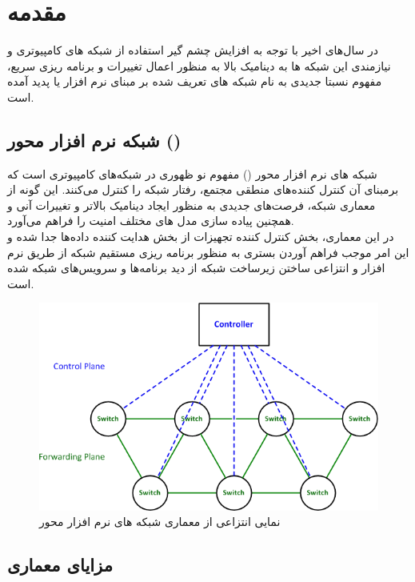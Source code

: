\chapter{مقدمه}
در سال‌های اخیر با توجه به افزایش چشم گیر استفاده از شبکه های کامپیوتری و نیازمندی این شبکه ها به دینامیک بالا به منظور اعمال تغییرات و برنامه ریزی سریع، مفهوم نسبتا جدیدی به نام شبکه های تعریف شده بر مبنای نرم افزار یا  پدید آمده است.

\section{شبکه نرم افزار محور ()}
شبکه های نرم افزار محور () مفهوم نو ظهوری در شبکه‌های کامپیوتری است که برمبنای آن کنترل کننده‌های منطقی مجتمع، رفتار شبکه را کنترل می‌کنند. این گونه از معماری شبکه، فرصت‌های جدیدی به منظور ایجاد دینامیک بالاتر و تغییرات آنی و همچنین پیاده سازی مدل های مختلف امنیت را فراهم می‌آورد.\\
در این معماری، بخش کنترل کننده تجهیزات از بخش هدایت کننده داده‌ها جدا شده و این امر موجب فراهم آوردن بستری به منظور برنامه ریزی مستقیم شبکه از طریق نرم افزار و انتزاعی ساختن زیرساخت شبکه از دید برنامه‌ها و سرویس‌های شبکه شده است.

\begin{figure}
	\centering
	\includegraphics[scale=0.5]{imgs/SDN_controller.png}
	\caption{نمایی انتزاعی از معماری شبکه های نرم افزار محور}
	\label{fig1}
\end{figure}

\section{مزایای معماری }


